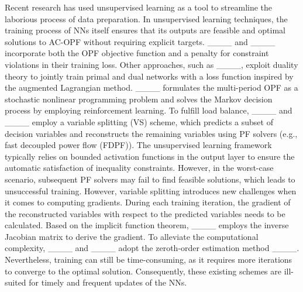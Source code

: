 Recent research has used unsupervised learning as a tool to streamline the laborious process of data preparation. In unsupervised learning techniques, the training process of NNs itself ensures that its outputs are feasible and optimal solutions to AC-OPF without requiring explicit targets. ____ and ____ incorporate both the OPF objective function and a penalty for constraint violations in their training loss. Other approaches, such as ____, exploit duality theory to jointly train primal and dual networks with a loss function inspired by the augmented Lagrangian method. ____ formulates the multi-period OPF as a stochastic nonlinear programming problem and solves the Markov decision process by employing reinforcement learning. To fulfill load balance, ____ and ____ employ a variable splitting (VS) scheme, which predicts a subset of decision variables and reconstructs the remaining variables using PF solvers (e.g., fast decoupled power flow (FDPF)). The unsupervised learning framework typically relies on bounded activation functions in the output layer to ensure the automatic satisfaction of inequality constraints. However, in the worst-case scenario, subsequent PF solvers may fail to find feasible solutions, which leads to unsuccessful training. However, variable splitting introduces new challenges when it comes to computing gradients. During each training iteration, the gradient of the reconstructed variables with respect to the predicted variables needs to be calculated. Based on the implicit function theorem, ____ employs the inverse Jacobian matrix to derive the gradient. To alleviate the computational complexity, ____ and ____ adopt the zeroth-order estimation method ____. Nevertheless, training can still be time-consuming, as it requires more iterations to converge to the optimal solution. Consequently, these existing schemes are ill-suited for timely and frequent updates of the NNs.